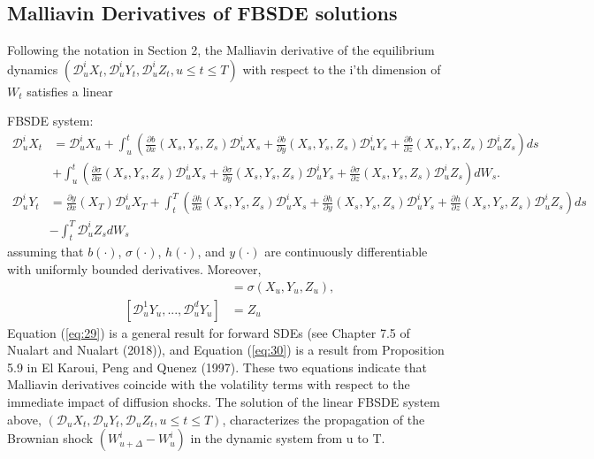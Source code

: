 \documentclass{article}
\begin{document}
\subsection{Malliavin Derivatives of FBSDE solutions}

Following the notation in Section 2, the Malliavin derivative of the equilibrium dynamics $(\mathcal{D}_{u}^{i}X_{t}, \mathcal{D}_{u}^{i}Y_{t}, \mathcal{D}_{u}^{i}Z_{t}, u\le t\le T)$ with respect to the i'th dimension of $W_{t}$ satisfies a linear

\clearpage

FBSDE system:
\begin{align*}
\mathcal{D}_{u}^{i}X_{t}&=\mathcal{D}_{u}^{i}X_{u}+\int_{u}^{t}\left(\frac{\partial b}{\partial x}(X_{s},Y_{s},Z_{s})\mathcal{D}_{u}^{i}X_{s}+\frac{\partial b}{\partial y}(X_{s},Y_{s},Z_{s})\mathcal{D}_{u}^{i}Y_{s}+\frac{\partial b}{\partial z}(X_{s},Y_{s},Z_{s})\mathcal{D}_{u}^{i}Z_{s}\right)ds \\
&+\int_{u}^{t}\left(\frac{\partial\sigma}{\partial x}(X_{s},Y_{s},Z_{s})\mathcal{D}_{u}^{i}X_{s}+\frac{\partial\sigma}{\partial y}(X_{s},Y_{s},Z_{s})\mathcal{D}_{u}^{i}Y_{s}+\frac{\partial\sigma}{\partial z}(X_{s},Y_{s},Z_{s})\mathcal{D}_{u}^{i}Z_{s}\right)dW_{s}.
\end{align*}
\begin{align*}
\mathcal{D}_{u}^{i}Y_{t}&=\frac{\partial y}{\partial x}(X_{T})\mathcal{D}_{u}^{i}X_{T}+\int_{t}^{T}\left(\frac{\partial h}{\partial x}(X_{s},Y_{s},Z_{s})\mathcal{D}_{u}^{i}X_{s}+\frac{\partial h}{\partial y}(X_{s},Y_{s},Z_{s})\mathcal{D}_{u}^{i}Y_{s}+\frac{\partial h}{\partial z}(X_{s},Y_{s},Z_{s})\mathcal{D}_{u}^{i}Z_{s}\right)ds \\
&-\int_{t}^{T}\mathcal{D}_{u}^{i}Z_{s}dW_{s}
\end{align*}
assuming that $b(\cdot)$, $\sigma(\cdot)$, $h(\cdot)$, and $y(\cdot)$ are continuously differentiable with uniformly bounded derivatives. Moreover,
\begin{align}
[\mathcal{D}_{u}^{1}X_{u},...,\mathcal{D}_{u}^{d}X_{u}]&=\sigma(X_{u},Y_{u},Z_{u}), \label{eq:29} \\
[\mathcal{D}_{u}^{1}Y_{u},...,\mathcal{D}_{u}^{d}Y_{u}]&=Z_{u} \label{eq:30}
\end{align}
Equation (\ref{eq:29}) is a general result for forward SDEs (see Chapter 7.5 of Nualart and Nualart (2018)), and Equation (\ref{eq:30}) is a result from Proposition 5.9 in El Karoui, Peng and Quenez (1997). These two equations indicate that Malliavin derivatives coincide with the volatility terms with respect to the immediate impact of diffusion shocks. The solution of the linear FBSDE system above, $(\mathcal{D}_{u}X_{t},\mathcal{D}_{u}Y_{t},\mathcal{D}_{u}Z_{t}, u\le t\le T)$, characterizes the propagation of the Brownian shock $(W_{u+\Delta}^{i}-W_{u}^{i})$ in the dynamic system from u to T.
\end{document}
